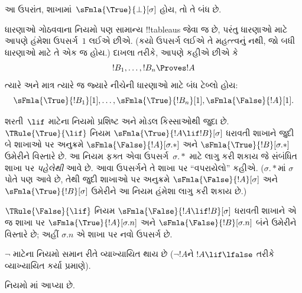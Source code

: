 \documentclass[../../../include/open-logic-section]{subfiles}
\begin{document}
આ ઉપરાંત, શાખામાં~$\sFmla{\True}{\bot}[\sigma]$
હોય, તો તે બંધ છે.

ધારણાઓ ગોઠવવાના નિયમો પણ સામાન્ય !!{tableau}s
જેવા જ છે, પરંતુ ધારણાઓ માટે આપણે હંમેશા
ઉપસર્ગ~$1$ લઈએ છીએ. (કયો ઉપસર્ગ લઈએ તે
મહત્ત્વનું નથી, જો બધી ધારણાઓ માટે તે એક જ હોય.)
દાખલા તરીકે, આપણે કહીએ છીએ કે
\[
!B_1, \dots, !B_n \Proves !A
\]
ત્યારે અને માત્ર ત્યારે જ જ્યારે નીચેની ધારણાઓ
માટે બંધ ટેબ્લો હોય:
\[
\sFmla{\True}{!B_1}[1], \dots, \sFmla{\True}{!B_n}[1],
\sFmla{\False}{!A}[1].
\]

શરતી~$\lif$ માટેના નિયમો પ્રશિષ્ટ અને મોડલ
કિસ્સાઓથી જુદા છે. $\TRule{\True}{\lif}$ નિયમ
$\sFmla{\True}{!A \lif !B}[\sigma]$ ધરાવતી શાખાને
જુદી બે શાખાઓ પર અનુક્રમે
$\sFmla{\False}{!A}[\sigma.{*}]$ અને
$\sFmla{\True}{!B}[\sigma.{*}]$ ઉમેરીને વિસ્તારે છે.
આ નિયમ ફક્ત એવા ઉપસર્ગ~$\sigma.{*}$ માટે
લાગુ કરી શકાય જે સંબંધિત શાખા પર \emph{પહેલેથી}
આવે છે. આવા ઉપસર્ગને તે શાખા પર ``વપરાયેલો''
કહીએ. ($\sigma.{*}$માં $\sigma$ પોતે પણ આવે છે,
તેથી જુદી શાખાઓ પર અનુક્રમે
$\sFmla{\False}{!A}[\sigma]$ અને
$\sFmla{\True}{!B}[\sigma]$ ઉમેરીને આ નિયમ
હંમેશા લાગુ કરી શકાય છે.)

$\TRule{\False}{\lif}$ નિયમ
$\sFmla{\False}{!A \lif !B}[\sigma]$ ધરાવતી શાખાને
એ જ શાખા પર $\sFmla{\True}{!A}[\sigma.n]$
અને $\sFmla{\False}{!B}[\sigma.n]$ બંને ઉમેરીને
વિસ્તારે છે; અહીં $\sigma.n$ એ શાખા પર નવો
ઉપસર્ગ છે.

$\lnot$ માટેના નિયમો સમાન રીતે વ્યાખ્યાયિત થાય છે
($\lnot !A$ને $!A \lif \lfalse$ તરીકે વ્યાખ્યાયિત
કર્યા પ્રમાણે).

નિયમો માં આપ્યા છે.
\end{document}
